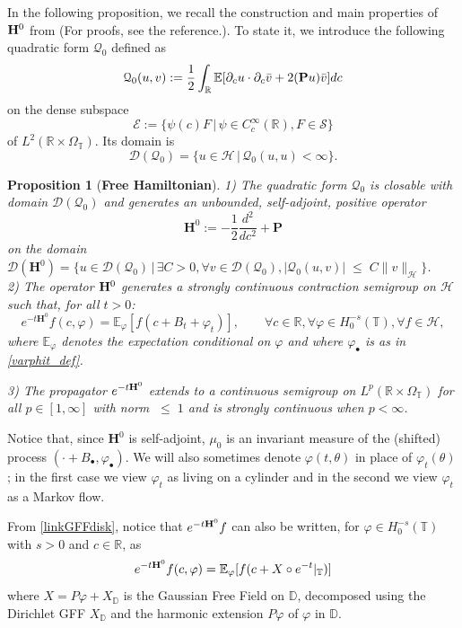 \documentclass[11pt]{amsart}
\numberwithin{equation}{section}
\newtheorem{proposition}[theorem]{Proposition}
\theoremstyle{definition}
\renewcommand{\leq}{\;\leqslant\;}                   %
\renewcommand{\H}{\mathbb{H}}
\newcommand{\D}{\mathbb{D}}
\newcommand{\R}{\mathbb{R}}
\def\H{\mathbf{H}}
\def\bP{\mathbf{P}}
\def\E{\mathbb{E}}
\newcommand{\pl}{\partial}
\newcommand{\mc}{\mathcal}
\def\T{\mathbb{T}}
\begin{document}
In the following proposition, we recall the construction and main properties of ${\bf H}^0$ 
from  \cite[Propositions 4.3 \& 4.4 \& 4.5]{GKRV} (For proofs, see the reference.). To state it, we introduce the following quadratic form $\mc{Q}_0$ defined as
\[ \mc{Q}_0(u,v):=\frac{1}{2}\int_\R \E[ \pl_cu \cdot \pl_c\bar{v}+2({\bf P}u)\bar{v}]dc\]
on the dense subspace 
\begin{equation}\label{def_mcE}
\mc{E}:=\{ \psi(c)F\,|\, \psi\in C_c^\infty(\R), F\in \mc{S}\}
\end{equation} 
of $L^2(\R\times \Omega_\T)$. Its domain is 
\[\mc{D}(\mc{Q}_0)=\{ u\in \mc{H}\,|\, \mc{Q}_0(u,u)<\infty \}.\]


\begin{proposition}[\textbf{Free Hamiltonian}]\label{prop:FreeHamiltonian}
1) The quadratic form $\mc{Q}_0$ is closable with domain $\mc{D}(\mc{Q}_0)$ and generates an unbounded, self-adjoint, positive operator
\begin{equation}
\H^0:=-\frac 12 \frac{d^2}{dc^2} + \bP	
\end{equation}
on the domain $\mc{D}(\H^0)=\{u\in \mc{D}(\mc{Q}_0)\,|\, \exists C>0, \forall v\in \mc{D}(\mc{Q}_0), 
|\mc{Q}_0(u,v)|\leq C\|v\|_{\mc{H}}\}$.\\ 
2) The operator ${\bf H}^0$ generates a  strongly continuous contraction semigroup on $\mc{H}$ such that, for all $t > 0$:
\[
e^{-t\H^0}f(c,\varphi)= \E_{\varphi}[f(c+B_t+\varphi_t)],
\qquad \forall c \in \R, \forall \varphi \in H^{-s}_0(\T), \forall f \in \mc{H},	
\]
where $\E_\varphi$ denotes the expectation conditional on $\varphi$ and where $\varphi_\bullet$ is as in \eqref{varphit_def}.

3) The propagator $e^{-t{\bf H}^0}$ extends to a continuous semigroup on $L^p(\R\times \Omega_\T)$ for all $p\in [1,\infty]$ with norm $\leq 1$ and is strongly continuous when $p<\infty$.
\end{proposition}


Notice that, since $\mathbf{H}^0$ is self-adjoint, $\mu_0$ is an invariant measure of the (shifted) process $(\cdot + B_\bullet,\varphi_\bullet)$. 
We will also sometimes denote $\varphi (t, \theta)$ in place of $\varphi_t (\theta)$; in the first case we view $\varphi_t$ as living on a cylinder and in the second we view $\varphi_t$ as a Markov flow.

From \eqref{linkGFFdisk}, notice that  $e^{-t{\bf H}^0}f$ can also be written, for $\varphi\in H_0^{-s}(\T)$ with $s>0$ and $c\in \R$, as 
\[ e^{-t{\bf H}^0}f(c,\varphi)=\E_{\varphi}[f(c+X\circ e^{-t}|_{\T})]\]
where $X=P\varphi+X_\D$ is the Gaussian Free Field on $\D$, decomposed using the Dirichlet GFF $X_\D$ and the harmonic extension $P\varphi$ of $\varphi$ in $\D$. 
\end{document}
